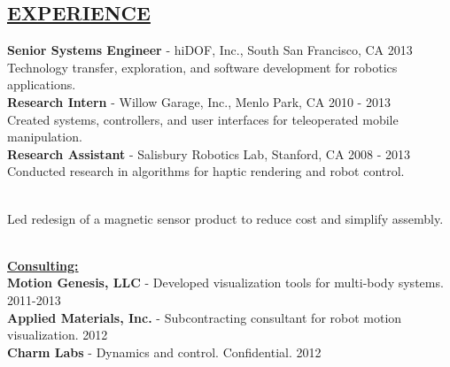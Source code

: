 \documentclass[line,margin]{res}
\newcommand{\CVOnly}[1]{}
\newcommand{\CVOnly}[1]{#1}
\newcommand{\hide}[1]{}
\begin{document}
\begin{resume}
\section{\underline{EXPERIENCE}} 
\vspace{1.0pc}
{\bf Senior Systems Engineer} -  hiDOF, Inc., South San Francisco, CA  \hfill 2013
\\[0.0pc]Technology transfer, exploration, and software development for robotics applications.
%
\\[0.4pc]{\bf Research Intern} - Willow Garage, Inc., Menlo Park, CA \hfill 2010 - 2013
\\[0.0pc]Created systems, controllers, and user interfaces for teleoperated mobile manipulation.
%
\\[0.4pc]{\bf Research Assistant} - Salisbury Robotics Lab, Stanford, CA \hfill 2008 - 2013
\\[0.0pc]Conducted research in algorithms for haptic rendering and robot control.
\CVOnly{\\[0.0pc]Implemented miniature stereo camera sensor hardware for a robot gripper.}
%
\CVOnly{
\\[0.4pc]{\bf Electrical Engineering Intern} - Qual-Tron, Inc., Tulsa, OK \hfill 2006 - 2007 }
\CVOnly{\\[0.0pc] Designed and implemented test procedures for IR and magnetic sensor products. }
\\[0.0pc]Led redesign of a magnetic sensor product to reduce cost and simplify assembly.
%
\hide{
\\[0.4pc]{\bf Summer Intern} - Atmel Corporation \hfill 2005
\\[0.4pc]{\bf Summer Research Intern} - NASA Glenn Research Center \hfill 2004%
}
%
\\[0.4pc]{\bf \underline{Consulting:}}
\\[0.2pc]{\bf Motion Genesis, LLC} - Developed visualization tools for multi-body systems. \hfill 2011-2013
\\[0.0pc]{\bf Applied Materials, Inc.} - Subcontracting consultant for robot motion visualization. \hfill 2012
\\[0.0pc]{\bf Charm Labs} - Dynamics and control. Confidential. \hfill 2012
%

%
%

\end{resume}
\end{document}
